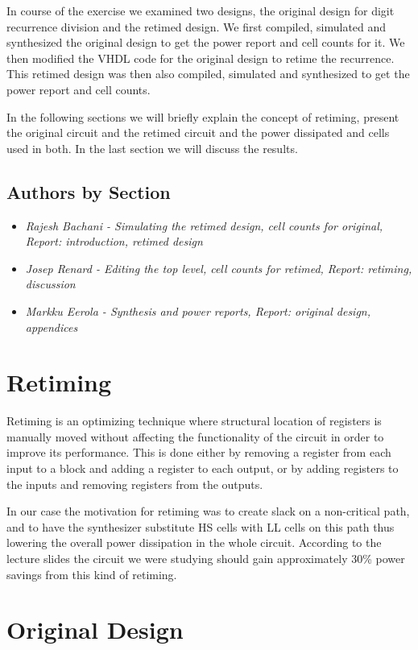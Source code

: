 \documentclass[11pt,a4paper]{article}
\begin{document}
In course of the exercise we examined two designs, the original design for digit recurrence division and the retimed design. We first compiled, simulated and synthesized the original design to get the power report and cell counts for it. We then modified the VHDL code for the original design to retime the recurrence. This retimed design was then also compiled, simulated and synthesized to get the power report and cell counts.

In the following sections we will briefly explain the concept of retiming, present the original circuit and the retimed circuit and the power dissipated and cells used in both. In the last section we will discuss the results.

\subsection{Authors by Section}
\begin{itemize}
\item \textit{Rajesh Bachani - Simulating the retimed design, cell counts for original, Report: introduction, retimed design} 
\item \textit{Josep Renard - Editing the top level, cell counts for retimed, Report: retiming, discussion} 
\item \textit{Markku Eerola - Synthesis and power reports, Report: original design, appendices} 
\end{itemize}

\section{Retiming}
Retiming is an optimizing technique where structural location of registers is manually moved without affecting the functionality of the circuit in order to improve its performance. This is done either by removing a register from each input to a block and adding a register to each output, or by adding registers to the inputs and removing registers from the outputs.

In our case the motivation for retiming was to create slack on a non-critical path, and to have the synthesizer substitute HS cells with LL cells on this path thus lowering the overall power dissipation in the whole circuit. According to the lecture slides the circuit we were studying should gain approximately 30\% power savings from this kind of retiming.

\section{Original Design}
\end{document}
